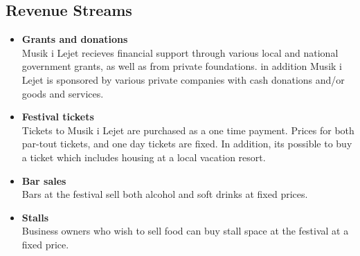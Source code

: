 \subsection{Revenue Streams} %
\label{sub:revenue_streams}
\begin{itemize}
	\item \textbf{Grants and donations}\\
	Musik i Lejet recieves financial support through various local and national government grants, as well as from private foundations. in addition Musik i Lejet is sponsored by various private companies with cash donations and/or goods and services.
	\item \textbf{Festival tickets}\\
	Tickets to Musik i Lejet are purchased as a one time payment. Prices for both par-tout tickets, and one day tickets are fixed. In addition, its possible to buy a ticket which includes housing at a local vacation resort.
	\item \textbf{Bar sales}\\
	Bars at the festival sell both alcohol and soft drinks at fixed prices.
	\item \textbf{Stalls}\\
	Business owners who wish to sell food can buy stall space at the festival at a fixed price.
\end{itemize}

